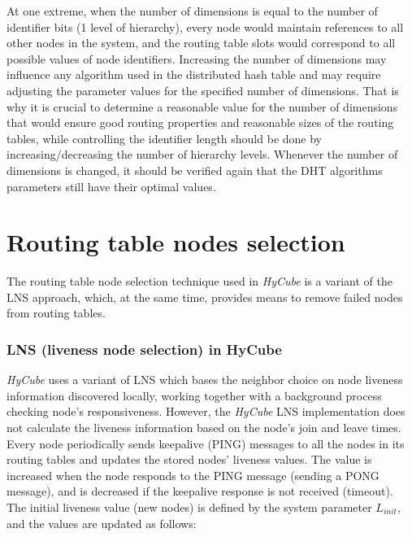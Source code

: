 At one extreme, when the number of dimensions is equal to the number of identifier bits (1 level of hierarchy), every node would maintain references to all other nodes in the system, and the routing table slots would correspond to all possible values of node identifiers. Increasing the number of dimensions may influence any algorithm used in the distributed hash table and may require adjusting the parameter values for the specified number of dimensions. That is why it is crucial to determine a reasonable value for the number of dimensions that would ensure good routing properties and reasonable sizes of the routing tables, while controlling the identifier length should be done by increasing/decreasing the number of hierarchy levels. Whenever the number of dimensions is changed, it should be verified again that the DHT algorithms parameters still have their optimal values.










\section{Routing table nodes selection}
\label{sec:HyCubeNodeSelection}

The routing table node selection technique used in \emph{HyCube} is a variant of the LNS approach, which, at the same time, provides means to remove failed nodes from routing tables.


\subsubsection{LNS (liveness node selection) in HyCube}
\label{sec:HyCubeNodeSelectionLNS}

\emph{HyCube} uses a variant of LNS which bases the neighbor choice on node liveness information discovered locally, working together with a background process checking node's responsiveness. However, the \emph{HyCube} LNS implementation does not calculate the liveness information based on the node's join and leave times. Every node periodically sends keepalive (PING) messages to all the nodes in its routing tables and updates the stored nodes' liveness values. The value is increased when the node responds to the PING message (sending a PONG message), and is decreased if the keepalive response is not received (timeout). The initial liveness value (new nodes) is defined by the system parameter $L_{init}$, and the values are updated as follows:

